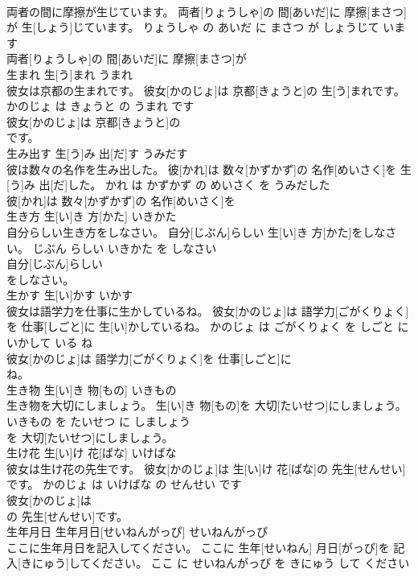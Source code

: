 \documentclass[8pt]{extreport}
\begin{document}
\begin{CJK}{UTF8}{min}
\\	両者の間に摩擦が生じています。	両者[りょうしゃ]の 間[あいだ]に 摩擦[まさつ]が 生[しょう]じています。	りょうしゃ の あいだ に まさつ が しょうじて います	
\\	両者[りょうしゃ]の 間[あいだ]に 摩擦[まさつ]が
\\	生まれ	生[う]まれ	うまれ	
\\	彼女は京都の生まれです。	彼女[かのじょ]は 京都[きょうと]の 生[う]まれです。	かのじょ は きょうと の うまれ です	
\\	彼女[かのじょ]は 京都[きょうと]の
\\	です。			
\\	生み出す	生[う]み 出[だ]す	うみだす	
\\	彼は数々の名作を生み出した。	彼[かれ]は 数々[かずかず]の 名作[めいさく]を 生[う]み 出[だ]した。	かれ は かずかず の めいさく を うみだした	
\\	彼[かれ]は 数々[かずかず]の 名作[めいさく]を
\\	生き方	生[い]き 方[かた]	いきかた	
\\	自分らしい生き方をしなさい。	自分[じぶん]らしい 生[い]き 方[かた]をしなさい。	じぶん らしい いきかた を しなさい	
\\	自分[じぶん]らしい
\\	をしなさい。			
\\	生かす	生[い]かす	いかす	
\\	彼女は語学力を仕事に生かしているね。	彼女[かのじょ]は 語学力[ごがくりょく]を 仕事[しごと]に 生[い]かしているね。	かのじょ は ごがくりょく を しごと に いかして いる ね	
\\	彼女[かのじょ]は 語学力[ごがくりょく]を 仕事[しごと]に
\\	ね。			
\\	生き物	生[い]き 物[もの]	いきもの	
\\	生き物を大切にしましょう。	生[い]き 物[もの]を 大切[たいせつ]にしましょう。	いきもの を たいせつ に しましょう	
\\	を 大切[たいせつ]にしましょう。			
\\	生け花	生[い]け 花[ばな]	いけばな	
\\	彼女は生け花の先生です。	彼女[かのじょ]は 生[い]け 花[ばな]の 先生[せんせい]です。	かのじょ は いけばな の せんせい です	
\\	彼女[かのじょ]は
\\	の 先生[せんせい]です。			
\\	生年月日	生年月日[せいねんがっぴ]	せいねんがっぴ	
\\	ここに生年月日を記入してください。	ここに 生年[せいねん] 月日[がっぴ]を 記入[きにゅう]してください。	ここ に せいねんがっぴ を きにゅう して ください	

\end{CJK}
\end{document}
